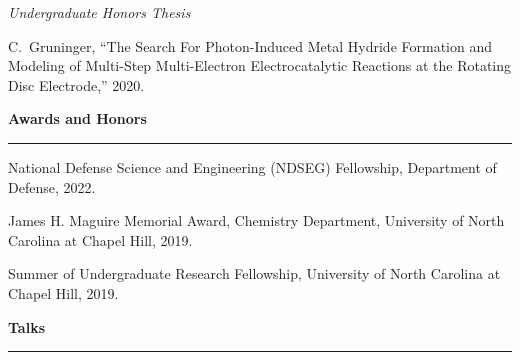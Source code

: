 \documentclass[10pt]{article}
\newcommand{\cvsection}[1]{%
  \vspace{0.8em}%
  {\large\bfseries #1\par}%
  \vspace{0.25em}%
  \hrule
  \vspace{0.3em}%
}
\begin{document}
\textit{Undergraduate Honors Thesis}

C.~Gruninger, ``The Search For Photon-Induced Metal Hydride Formation and Modeling of Multi-Step Multi-Electron Electrocatalytic Reactions at the Rotating Disc Electrode,'' 2020.

\newpage

\cvsection{Awards and Honors}

National Defense Science and Engineering (NDSEG) Fellowship, Department of Defense, 2022.\par
James H. Maguire Memorial Award, Chemistry Department, University of North Carolina at Chapel Hill, 2019.\par
Summer of Undergraduate Research Fellowship, University of North Carolina at Chapel Hill, 2019.

\cvsection{Talks}
\end{document}
